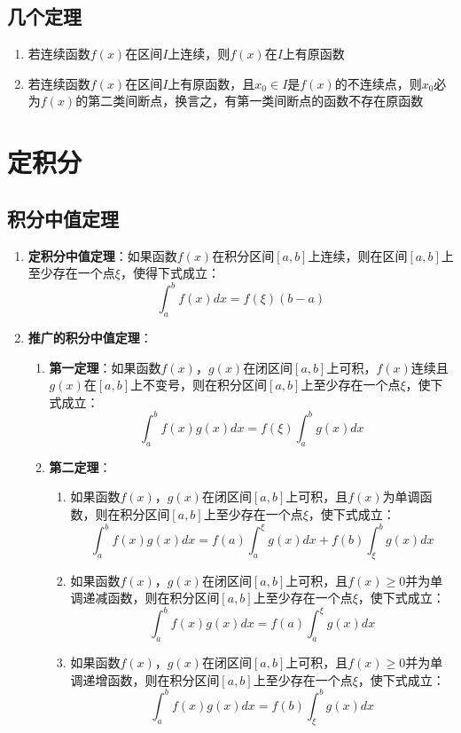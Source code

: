 \documentclass[12pt,a4paper,UTF8]{book}
\begin{document}
\subsection{几个定理}
\begin{enumerate}
\item 若连续函数$f\left(x\right)$在区间$I$上连续，则$f\left(x\right)$在$I$上有原函数
\item 若连续函数$f\left(x\right)$在区间$I$上有原函数，且$x_0\in I$是$f\left(x\right)$的不连续点，则$x_0$必为$f\left(x\right)$的第二类间断点，换言之，有第一类间断点的函数不存在原函数
\end{enumerate}


\section{定积分}
\subsection{积分中值定理}
\begin{enumerate}
\item \textbf{定积分中值定理}：如果函数$f\left(x\right)$在积分区间$\left[a,b\right]$上连续，则在区间$\left[a,b\right]$上至少存在一个点$\xi$，使得下式成立：
\[\int_{a}^{b}f\left(x\right)dx=f\left(\xi\right)\left(b-a\right)\]
\item \textbf{推广的积分中值定理}：
\begin{enumerate}
\item \textbf{第一定理}：如果函数$f\left(x\right)$，$g\left(x\right)$在闭区间$\left[a,b\right]$上可积，$f\left(x\right)$连续且$g\left(x\right)$在$\left[a,b\right]$上不变号，则在积分区间$\left[a,b\right]$上至少存在一个点$\xi$，使下式成立：
\[\int_{a}^{b}f\left(x\right)g\left(x\right)dx=f\left(\xi\right)\int_{a}^{b}g\left(x\right)dx\]
\item \textbf{第二定理}：
\begin{enumerate}
\item 如果函数$f\left(x\right)$，$g\left(x\right)$在闭区间$\left[a,b\right]$上可积，且$f\left(x\right)$为单调函数，则在积分区间$\left[a,b\right]$上至少存在一个点$\xi$，使下式成立：
\[\int_{a}^{b}f\left(x\right)g\left(x\right)dx=f\left(a\right)\int_{a}^{\xi}g\left(x\right)dx+f\left(b\right)\int_{\xi}^{b}g\left(x\right)dx\]
\item 如果函数$f\left(x\right)$，$g\left(x\right)$在闭区间$\left[a,b\right]$上可积，且$f\left(x\right)\geq0$并为单调递减函数，则在积分区间$\left[a,b\right]$上至少存在一个点$\xi$，使下式成立：
\[\int_{a}^{b}f\left(x\right)g\left(x\right)dx=f\left(a\right)\int_{a}^{\xi}g\left(x\right)dx\]
\item 如果函数$f\left(x\right)$，$g\left(x\right)$在闭区间$\left[a,b\right]$上可积，且$f\left(x\right)\geq0$并为单调递增函数，则在积分区间$\left[a,b\right]$上至少存在一个点$\xi$，使下式成立：
\[\int_{a}^{b}f\left(x\right)g\left(x\right)dx=f\left(b\right)\int_{\xi}^{b}g\left(x\right)dx\]
\end{enumerate}
\end{enumerate}
\end{enumerate}
\end{document}
